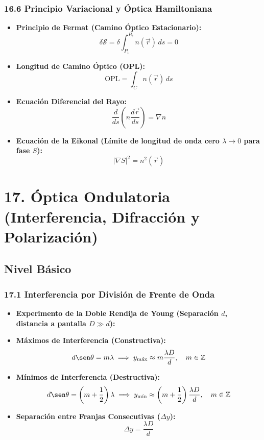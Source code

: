 \documentclass[11pt,a4paper]{article}
\begin{document}
\subsubsection*{16.6 Principio Variacional y Óptica Hamiltoniana}

\begin{itemize}
  \item \textbf{Principio de Fermat (Camino Óptico Estacionario):}
  \[
    \delta \mathcal{S} = \delta \int_{P_1}^{P_2} n(\vec{r}) \, ds = 0
  \]
  \item \textbf{Longitud de Camino Óptico (OPL):}
  \[
    \text{OPL} = \int_C n(\vec{r}) \, ds
  \]
  \item \textbf{Ecuación Diferencial del Rayo:}
  \[
    \frac{d}{ds}\left( n \frac{d\vec{r}}{ds} \right) = \nabla n
  \]
  \item \textbf{Ecuación de la Eikonal (Límite de longitud de onda cero $\lambda \to 0$ para fase $S$):}
  \[
    |\nabla S|^2 = n^2(\vec{r})
  \]
\end{itemize}

\section*{17. Óptica Ondulatoria (Interferencia, Difracción y Polarización)}

\subsection*{Nivel Básico}

\subsubsection*{17.1 Interferencia por División de Frente de Onda}

\begin{itemize}
  \item \textbf{Experimento de la Doble Rendija de Young (Separación $d$, distancia a pantalla $D \gg d$):}
  \item \textbf{Máximos de Interferencia (Constructiva):}
  \[
    d \sen\theta = m \lambda \implies y_{\text{máx}} \approx m \frac{\lambda D}{d}, \quad m \in \mathbb{Z}
  \]
  \item \textbf{Mínimos de Interferencia (Destructiva):}
  \[
    d \sen\theta = \left( m + \frac{1}{2} \right)\lambda \implies y_{\text{mín}} \approx \left( m + \frac{1}{2} \right)\frac{\lambda D}{d}, \quad m \in \mathbb{Z}
  \]
  \item \textbf{Separación entre Franjas Consecutivas ($\Delta y$):}
  \[
    \Delta y = \frac{\lambda D}{d}
  \]
\end{itemize}
\end{document}
